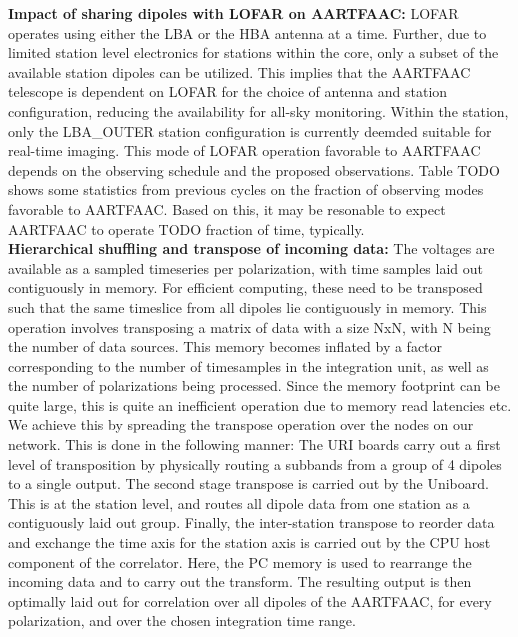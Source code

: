\documentclass{ws-jai}
\begin{document}
\noindent  \textbf {Impact  of sharing  dipoles with  LOFAR on  AARTFAAC:} LOFAR
operates using  either the LBA  or the  HBA antenna at  a time. Further,  due to
limited station level electronics for stations within the core, only a subset of
the available  station dipoles can be  utilized. This implies that  the AARTFAAC
telescope  is  dependent  on  LOFAR  for  the  choice  of  antenna  and  station
configuration,  reducing the  availability  for all-sky  monitoring. Within  the
station, only the LBA\_OUTER station configuration is currently deemded suitable
for  real-time imaging.   This mode  of  LOFAR operation  favorable to  AARTFAAC
depends on  the observing  schedule and the  proposed observations.   Table TODO
shows some  statistics from previous cycles  on the fraction of  observing modes
favorable to AARTFAAC. Based on this, it  may be resonable to expect AARTFAAC to
operate TODO fraction of time, typically.\\

\noindent \textbf {Hierarchical  shuffling and transpose of  incoming data:} The
voltages  are available  as a  sampled  timeseries per  polarization, with  time
samples laid out contiguously in memory.  For efficient computing, these need to
be transposed such that the same  timeslice from all dipoles lie contiguously in
memory. This  operation involves transposing a  matrix of data with  a size NxN,
with N  being the  number of data  sources.  This memory  becomes inflated  by a
factor corresponding  to the number of  timesamples in the integration  unit, as
well as the number of polarizations  being processed. Since the memory footprint
can be quite  large, this is quite  an inefficient operation due  to memory read
latencies etc.\\

We achieve this by spreading the transpose operation over the nodes
on our network. This is done in the following manner:
The URI boards carry out a first  level of transposition by physically routing a
subbands  from a  group  of 4  dipoles  to  a single  output.  The second  stage
transpose is  carried out  by the Uniboard.  This is at  the station  level, and
routes  all dipole  data from  one  station as  a contiguously  laid out  group.
Finally, the inter-station transpose to reorder  data and exchange the time axis
for  the  station  axis  is  carried  out by  the  CPU  host  component  of  the
correlator. Here, the  PC memory is used  to rearrange the incoming  data and to
carry out  the transform. The  resulting output is  then optimally laid  out for
correlation over all  dipoles of the AARTFAAC, for every  polarization, and over
the chosen integration time range.
\end{document}
